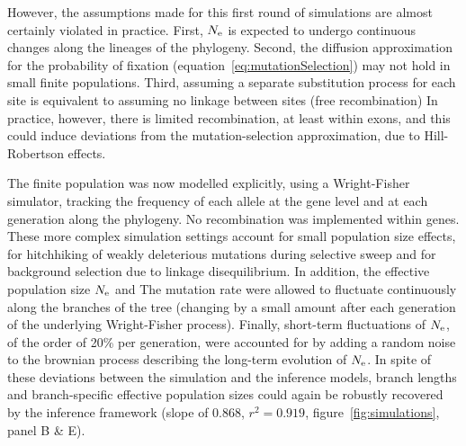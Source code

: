 However, the assumptions made for this first round of simulations are almost certainly violated in practice.
First, $N_{\text{e}}$ is expected to undergo continuous changes along the lineages of the phylogeny.
Second, the diffusion approximation for the probability of fixation (equation~\ref{eq:mutationSelection}) may not hold in small finite populations.
Third, assuming a separate substitution process for each site is equivalent to assuming no linkage between sites (free recombination)
In practice, however, there is limited recombination, at least within exons, and this could induce deviations from the mutation-selection approximation, due to Hill-Robertson effects.

The finite population was now modelled explicitly, using a Wright-Fisher simulator, tracking the frequency of each allele at the gene level and at each generation along the phylogeny.
No recombination was implemented within genes.
These more complex simulation settings account for small population size effects, for hitchhiking of weakly deleterious mutations during selective sweep and for background selection due to linkage disequilibrium.
In addition, the effective population size $N_{\text{e}}$ and The mutation rate were allowed to fluctuate continuously along the branches of the tree (changing by a small amount after each generation of the underlying Wright-Fisher process).
Finally, short-term fluctuations of $N_{\text{e}}$, of the order of 20\% per generation, were accounted for by adding a random noise to the brownian process describing the long-term evolution of $N_{\text{e}}$.
In spite of these deviations between the simulation and the inference models, branch lengths and branch-specific effective population sizes could again be robustly recovered by the inference framework (slope of $0.868$, $r^2=0.919$, figure~\ref{fig:simulations}, panel B \& E).

